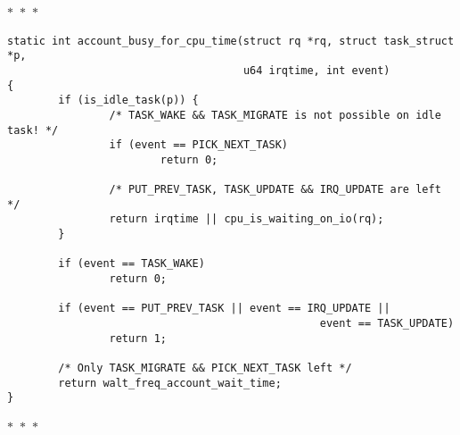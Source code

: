 \documentclass{article}
\newcommand{\divider}{{\begin{center}
  $\ast$~$\ast$~$\ast$
\end{center}}}
\begin{document}
\divider
\begin{verbatim}
static int account_busy_for_cpu_time(struct rq *rq, struct task_struct *p,
                                     u64 irqtime, int event)
{
        if (is_idle_task(p)) {
                /* TASK_WAKE && TASK_MIGRATE is not possible on idle task! */
                if (event == PICK_NEXT_TASK)
                        return 0;

                /* PUT_PREV_TASK, TASK_UPDATE && IRQ_UPDATE are left */
                return irqtime || cpu_is_waiting_on_io(rq);
        }

        if (event == TASK_WAKE)
                return 0;

        if (event == PUT_PREV_TASK || event == IRQ_UPDATE ||
                                                 event == TASK_UPDATE)
                return 1;

        /* Only TASK_MIGRATE && PICK_NEXT_TASK left */
        return walt_freq_account_wait_time;
}
\end{verbatim}
\divider
\end{document}
